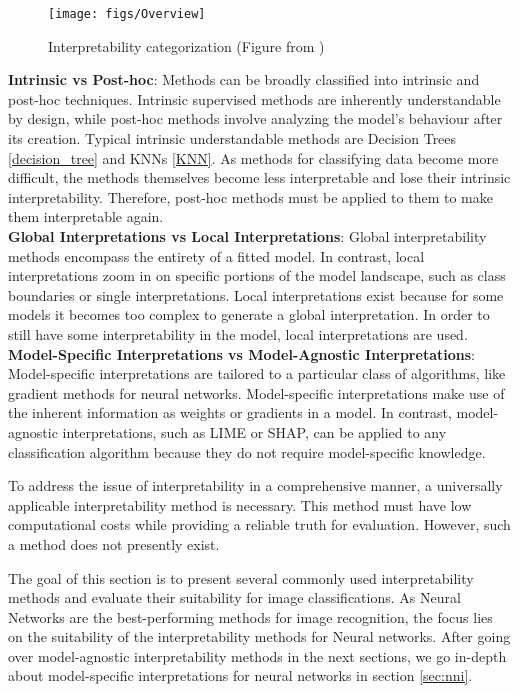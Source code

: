 \begin{figure}[H]
	\centering
	\texttt{[image: figs/Overview]}
	\caption[Interpretability categorization ]{Interpretability categorization (Figure from \cite{allen2023interpretable})}
	\label{fig:IML_Overview}
\end{figure}
\newpage
\textbf{Intrinsic vs Post-hoc}: Methods can be broadly classified into intrinsic and post-hoc techniques. Intrinsic supervised methods are inherently understandable by design, while post-hoc methods involve analyzing the model's behaviour after its creation. Typical intrinsic understandable methods are Decision Trees \ref{decision_tree} and KNNs \ref{KNN}. As methods for classifying data become more difficult, the methods themselves become less interpretable and lose their intrinsic interpretability. Therefore, post-hoc methods must be applied to them to make them interpretable again.
\\
\textbf{Global Interpretations vs Local Interpretations}: Global interpretability methods encompass the entirety of a fitted model. In contrast, local interpretations zoom in on specific portions of the model landscape, such as class boundaries or single interpretations. Local interpretations exist because for some models it becomes too complex to generate a global interpretation. In order to still have some interpretability in the model, local interpretations are used.
\\
\textbf{Model-Specific Interpretations vs Model-Agnostic Interpretations}: 
Model-specific interpretations are tailored to a particular class of algorithms, like gradient methods for neural networks. Model-specific interpretations make use of the inherent information as weights or gradients in a model. In contrast, model-agnostic interpretations, such as LIME or SHAP, can be applied to any classification algorithm because they do not require model-specific knowledge.

To address the issue of interpretability in a comprehensive manner, a universally applicable interpretability method is necessary. This method must have low computational costs while providing a reliable truth for evaluation. However, such a method does not presently exist.

The goal of this section is to present several commonly used interpretability methods and evaluate their suitability for image classifications. As Neural Networks are the best-performing methods for image recognition, the focus lies on the suitability of the interpretability methods for Neural networks. After going over model-agnostic interpretability methods in the next sections, we go in-depth about model-specific interpretations for neural networks in section \ref{sec:nni}. 


